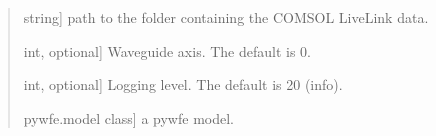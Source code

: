 \documentclass[letterpaper,10pt,english]{sphinxmanual}
\begin{document}
\begin{fulllineitems}
\label{\detokenize{utils:pywfe.utils.comsol_loader.load_comsol}}
\pysigstartsignatures
{}
\pysigstopsignatures\begin{quote}\begin{description}
\begin{description}
\sphinxlineitem{\sphinxstylestrong{folder}}{[}string{]}
\sphinxAtStartPar
path to the folder containing the COMSOL LiveLink data.

\sphinxlineitem{\sphinxstylestrong{axis}}{[}int, optional{]}
\sphinxAtStartPar
Waveguide axis. The default is 0.

\sphinxlineitem{\sphinxstylestrong{logging\_level}}{[}int, optional{]}
\sphinxAtStartPar
Logging level. The default is 20 (info).

\end{description}

\begin{description}
\sphinxlineitem{\sphinxstylestrong{model}}{[}pywfe.model class{]}
\sphinxAtStartPar
a pywfe model.

\end{description}

\end{description}\end{quote}

\end{fulllineitems}

\end{document}
